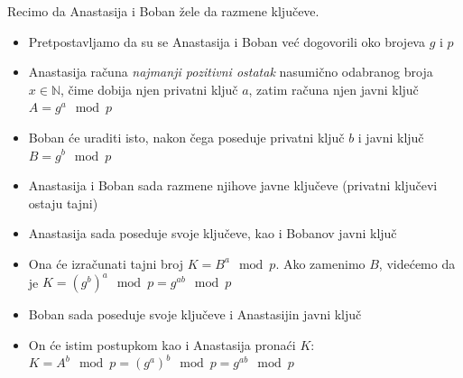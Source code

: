 \documentclass[a4paper]{article}
\begin{document}
Recimo da Anastasija i Boban žele da razmene ključeve.
\begin{itemize}
    \item Pretpostavljamo da su se Anastasija i Boban već dogovorili oko brojeva $g$ i $p$
    \item Anastasija računa \emph{najmanji pozitivni ostatak} nasumično odabranog broja $x \in \mathbb{N}$,
        čime dobija njen privatni ključ $a$, zatim računa njen javni ključ $A = g^a \mod p$
    \item Boban će uraditi isto, nakon čega poseduje privatni ključ $b$ i javni ključ $B = g^b \mod p$
    \item Anastasija i Boban sada razmene njihove javne ključeve (privatni ključevi ostaju tajni)
    \item Anastasija sada poseduje svoje ključeve, kao i Bobanov javni ključ
    \item Ona će izračunati tajni broj $K = B^a \mod p$. Ako zamenimo $B$, videćemo da je
        $K = (g^b)^a \mod p = g^{ab} \mod p$
    \item Boban sada poseduje svoje ključeve i Anastasijin javni ključ
    \item On će istim postupkom kao i Anastasija pronaći $K$:
        $K = A^b \mod p = (g^a)^b \mod p = g^{ab} \mod p$
\end{itemize}
\end{document}
